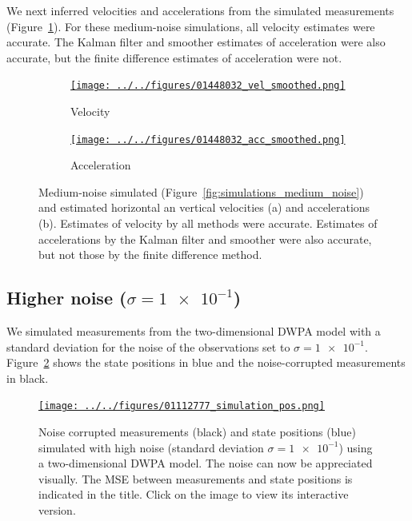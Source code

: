 \documentclass[12pt]{article}
\begin{document}
We next inferred velocities and accelerations from the simulated measurements
(Figure~\ref{fig:vel_acc_medium_noise}). For these medium-noise simulations,
all velocity estimates were accurate. The Kalman filter and smoother estimates
of acceleration were also accurate, but the finite difference estimates of
acceleration were not.

\begin{figure}

    \begin{subfigure}{\textwidth}
        \centering
        \href{http://www.gatsby.ucl.ac.uk/~rapela/fwg/lds_repo/inference/figures/01448032_vel_smoothed.html}{\texttt{[image: ../../figures/01448032\_vel\_smoothed.png]}}
        \caption{Velocity}
    \end{subfigure}

    \begin{subfigure}{\textwidth}
        \centering
        \href{http://www.gatsby.ucl.ac.uk/~rapela/fwg/lds_repo/inference/figures/01448032_acc_smoothed.html}{\texttt{[image: ../../figures/01448032\_acc\_smoothed.png]}}
        \caption{Acceleration}
    \end{subfigure}

    \caption{Medium-noise simulated
    (Figure~\ref{fig:simulations_medium_noise}) and estimated horizontal an
    vertical velocities (a) and accelerations (b).  Estimates of velocity by all
    methods were accurate. Estimates of accelerations by the Kalman filter and
    smoother were also accurate, but not those by the finite difference
    method.}

    \label{fig:vel_acc_medium_noise}

\end{figure}

\subsection{Higher noise ($\sigma=\num{1e-1}$)}

We simulated measurements from the two-dimensional DWPA model with a standard
deviation for the noise of the observations set to $\sigma=\num{1e-1}$.
Figure~\ref{fig:simulations_high_noise} shows the state positions in blue and
the noise-corrupted measurements in black.

\begin{figure}

    \centering
    \href{http://www.gatsby.ucl.ac.uk/~rapela/fwg/lds_repo/inference/figures/01112777_simulation_pos.html}{\texttt{[image: ../../figures/01112777\_simulation\_pos.png]}}

    \caption{Noise corrupted measurements (black) and state positions (blue)
    simulated with high noise (standard deviation $\sigma=\num{1e-1}$) using a
    two-dimensional DWPA model. The noise can now be appreciated visually.  The
    MSE between measurements and state positions is indicated in the title.
    Click on the image to view its interactive version.}

    \label{fig:simulations_high_noise}

\end{figure}
\end{document}
